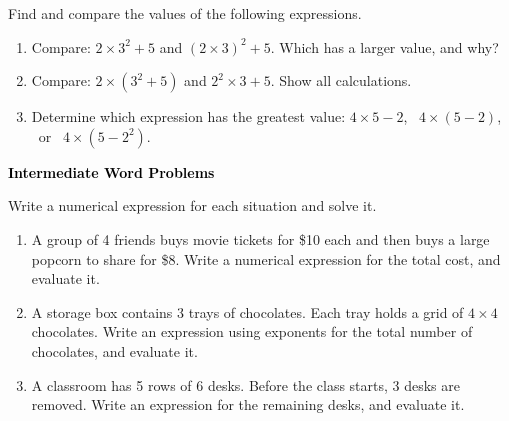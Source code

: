 \documentclass[12pt, letterpaper, fleqn]{article}
\begin{document}
\noindent
Find and compare the values of the following expressions.

\vspace{3mm}

\begin{enumerate}[itemsep=2.2cm, leftmargin=0.6cm]

\item Compare: $2 \times 3^2 + 5$ \quad and \quad $(2 \times 3)^2 + 5$. Which has a larger value, and why?

\vspace{2cm}

\item Compare: $2 \times (3^2 + 5)$ \quad and \quad $2^2 \times 3 + 5$. Show all calculations.

\vspace{2cm}

\item Determine which expression has the greatest value: $4 \times 5 - 2$, \ $4 \times (5 - 2)$, \ or \ $4 \times (5 - 2^2)$.

\vspace{2cm}

\end{enumerate}

\newpage

\begin{tcolorbox}[colback=black!10]
\large\textcolor{black}{\textbf{Intermediate Word Problems}}
\end{tcolorbox}

\noindent
Write a numerical expression for each situation and solve it.

\vspace{3mm}

\begin{enumerate}[itemsep=2.2cm, leftmargin=0.6cm]

\item A group of 4 friends buys movie tickets for \$10 each and then buys a large popcorn to share for \$8. Write a numerical expression for the total cost, and evaluate it.

\vspace{2.2cm}

\item A storage box contains 3 trays of chocolates. Each tray holds a grid of $4 \times 4$ chocolates. Write an expression using exponents for the total number of chocolates, and evaluate it.

\vspace{2.2cm}

\item A classroom has 5 rows of 6 desks. Before the class starts, 3 desks are removed. Write an expression for the remaining desks, and evaluate it.

\vspace{2.2cm}

\end{enumerate}
\end{document}
